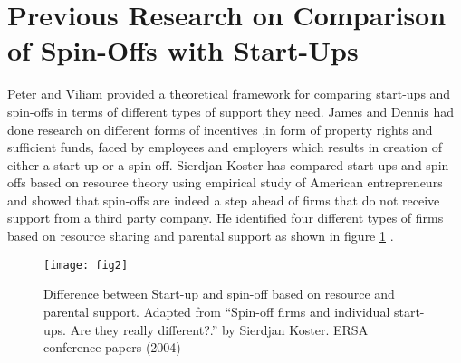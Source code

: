 \section{Previous Research on Comparison of Spin-Offs with Start-Ups\label{sec:previous_r_comparison}}
Peter and Viliam \cite{29} provided a theoretical framework for comparing start-ups and spin-offs in
terms of different types of support they need. James and Dennis \cite{31} had done research on different forms of incentives ,in form of property rights
and sufficient funds, faced by employees and employers which results in creation of either a start-up
or a spin-off.
Sierdjan Koster \cite{30} has compared start-ups and spin-offs based on resource theory using empirical
study of American entrepreneurs and showed that spin-offs are indeed a step ahead of firms that do
not receive support from a third party company. He identified four different types of firms based on
resource sharing and parental support as shown in figure \ref{fig2} .
\begin{figure}[htb]
	\centering
	\texttt{[image: fig2]}
	\caption{Difference between Start-up and spin-off based on resource and parental support. Adapted from ``Spin-off firms and individual start-ups. Are they really different?.'' by Sierdjan Koster. ERSA conference papers (2004)}
	\label{fig2}
\end{figure}

